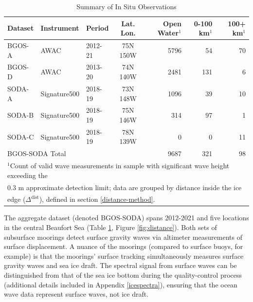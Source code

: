 \documentclass [11pt, proquest] {uwthesis}[2020/02/24]
\begin{document}
\begin{table}[!h]
\caption{Summary of In Situ Observations}
\centering
\begin{tabular}{l l l c r r r}
  \hline
  Dataset     & Instrument      & Period      & Lat. Lon. & Open Water$^1$ & 0-100 km$^1$ & 100+ km$^1$ \\
  \hline
  BGOS-A      & AWAC           & 2012-21   & 75N 150W  & 5796 &  54  & 70                  \\
  BGOS-D      & AWAC           & 2013-20   & 74N 140W  & 2481 & 131  &  6                  \\
  SODA-A      & Signature500   & 2018-19   & 73N 148W  & 1096 &  39  & 10                  \\
  SODA-B      & Signature500   & 2018-19   & 75N 146W  &  314 &  97  &  1                  \\
  SODA-C      & Signature500   & 2018-19   & 78N 139W  &    0 &   0  & 11                  \\
  \hline
  \multicolumn{4}{l}{BGOS-SODA Total} & 9687 & 321 & 98 \\
  \hline 
  \multicolumn{7}{l}{$^1$Count of valid wave measurements in sample with significant wave height exceeding the}\\
  \multicolumn{7}{l}{\hspace{5 pt}0.3 m approximate detection limit; data are grouped by distance inside the ice}\\
  \multicolumn{7}{l}{\hspace{5 pt}edge ($\Delta^{\mathrm{dist}}$), defined in section \ref{distance-method}.}\\
\end{tabular}
\label{tab:obs}
\end{table} 

The aggregate dataset (denoted BGOS-SODA) spans 2012-2021 and five locations in the central Beaufort Sea (Table \ref{tab:obs}, Figure \ref{fig:distance}). Both sets of subsurface moorings detect surface gravity waves via altimeter measurements of surface displacement. A nuance of the moorings (compared to surface buoys, for example) is that the moorings' surface tracking simultaneously measures surface gravity waves and sea ice draft. The spectral signal from surface waves can be distinguished from that of the sea ice bottom during the quality-control process (additional details included in Appendix \ref{icespectra}), ensuring that the ocean wave data represent surface waves, not ice draft.  
\end{document}
